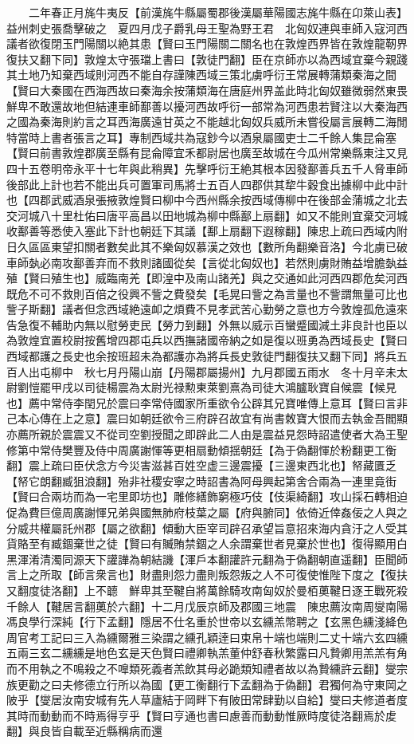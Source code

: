 　　二年春正月旄牛夷反【前漢旄牛縣屬蜀郡後漢屬華陽國志旄牛縣在卬萊山表】益州刺史張喬擊破之　夏四月戊子爵乳母王聖為野王君　北匈奴連與車師入寇河西議者欲復閉玉門陽關以絶其患【賢曰玉門陽關二關名也在敦煌西界皆在敦煌龍靭界復扶又翻下同】敦煌太守張璫上書曰【敦徒門翻】臣在京師亦以為西域宜棄今親踐其土地乃知棄西域則河西不能自存謹陳西域三策北虜呼衍王常展轉蒲類秦海之間【賢曰大秦國在西海西故曰秦海余按蒲類海在唐庭州界盖此時北匈奴雖微弱然東畏鮮卑不敢還故地但結連車師鄯善以擾河西故呼衍一部常為河西患若賢注以大秦海西之國為秦海則約言之耳西海廣遠甘英之不能越北匈奴兵威所未嘗役屬言展轉二海閒特當時上書者張言之耳】專制西域共為寇鈔今以酒泉屬國吏士二千餘人集昆侖塞【賢曰前書敦煌郡廣至縣有昆侖障宜禾都尉居也廣至故城在今瓜州常樂縣東注又見四十五卷明帝永平十七年與此稍異】先擊呼衍王絶其根本因發鄯善兵五千人脅車師後部此上計也若不能出兵可置軍司馬將士五百人四郡供其犂牛穀食出據柳中此中計也【四郡武威酒泉張掖敦煌賢曰柳中今西州縣余按西域傳柳中在後部金蒲城之北去交河城八十里杜佑曰唐平高昌以田地城為柳中縣鄯上扇翻】如又不能則宜棄交河城收鄯善等悉使入塞此下計也朝廷下其議【鄯上扇翻下遐稼翻】陳忠上疏曰西域内附日久區區東望扣關者數矣此其不樂匈奴慕漢之效也【數所角翻樂音洛】今北虜已破車師埶必南攻鄯善弃而不救則諸國從矣【言從北匈奴也】若然則虜財賄益增膽埶益殖【賢曰殖生也】威臨南羌【即湟中及南山諸羌】與之交通如此河西四郡危矣河西既危不可不救則百倍之役興不訾之費發矣【毛晃曰訾之為言量也不訾謂無量可比也訾子斯翻】議者但念西域絶遠卹之煩費不見孝武苦心勤勞之意也方今敦煌孤危遠來告急復不輔助内無以慰勞吏民【勞力到翻】外無以威示百蠻蹙國減土非良計也臣以為敦煌宜置校尉按舊增四郡屯兵以西撫諸國帝納之如是復以班勇為西域長史【賢曰西域都護之長史也余按班超未為都護亦為將兵長史敦徒門翻復扶又翻下同】將兵五百人出屯柳中　秋七月丹陽山崩【丹陽郡屬揚州】九月郡國五雨水　冬十月辛未太尉劉愷罷甲戌以司徒楊震為太尉光禄勲東萊劉熹為司徒大鴻臚耿寶自候震【候見也】薦中常侍李閏兄於震曰李常侍國家所重欲令公辟其兄寶唯傳上意耳【賢曰言非己本心傳在上之意】震曰如朝廷欲令三府辟召故宜有尚書敇寶大恨而去執金吾閻顯亦薦所親於震震又不從司空劉授聞之即辟此二人由是震益見怨時詔遣使者大為王聖修第中常侍樊豐及侍中周廣謝惲等更相扇動傾揺朝廷【為于偽翻惲於粉翻更工衡翻】震上疏曰臣伏念方今災害滋甚百姓空虚三邊震擾【三邊東西北也】帑藏匱乏【帑它朗翻臧狙浪翻】殆非社稷安寧之時詔書為阿母興起第舍合兩為一連里竟街【賢曰合兩坊而為一宅里即坊也】雕修繕飾窮極巧伎【伎渠綺翻】攻山採石轉相迫促為費巨億周廣謝惲兄弟與國無肺府枝葉之屬【府與腑同】依倚近倖姦佞之人與之分威共權屬託州郡【屬之欲翻】傾動大臣宰司辟召承望旨意招來海内貪汙之人受其貨賂至有臧錮棄世之徒【賢曰有贓賄禁錮之人余謂棄世者見棄於世也】復得顯用白黑渾淆清濁同源天下讙譁為朝結譏【渾戶本翻讙許元翻為于偽翻朝直遥翻】臣聞師言上之所取【師言衆言也】財盡則怨力盡則叛怨叛之人不可復使惟陛下度之【復扶又翻度徒洛翻】上不聼　鮮卑其至鞬自將萬餘騎攻南匈奴於曼栢薁鞬日逐王戰死殺千餘人【鞬居言翻薁於六翻】十二月戊辰京師及郡國三地震　陳忠薦汝南周燮南陽馮良學行深純【行下孟翻】隱居不仕名重於世帝以玄纁羔幣聘之【玄黑色纁淺絳色周官考工記曰三入為纁爾雅三染謂之纁孔穎逹曰束帛十端也端則二丈十端六玄四纁五兩三玄二纁纁是地色玄是天色賢曰禮卿執羔董仲舒春秋繁露曰凡贄卿用羔羔有角而不用執之不鳴殺之不嘷類死義者羔飲其母必跪類知禮者故以為贄纁許云翻】燮宗族更勸之曰夫修德立行所以為國【更工衡翻行下孟翻為于偽翻】君獨何為守東岡之陂乎【燮居汝南安城有先人草廬結于岡畔下有陂田常肆勤以自給】燮曰夫修道者度其時而動動而不時焉得亨乎【賢曰亨通也書曰慮善而動動惟厥時度徒洛翻焉於䖍翻】與良皆自載至近縣稱病而還

